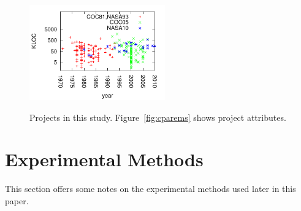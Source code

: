 \documentclass{sig-alternate}
\newcommand{\fig}[1]{Figure~\ref{fig:#1}}
\begin{document}
\begin{figure}[!t]
\begin{center}
~\\~\\

\includegraphics[width=2.3in]{yearLOC.pdf}
\noindent
\end{center}
\caption{Projects in this study. \fig{cparems}
shows project attributes.}\label{fig:types}
\end{figure}







\section{Experimental Methods}
This section offers some
notes on the experimental methods used later in this paper.


\end{document}
